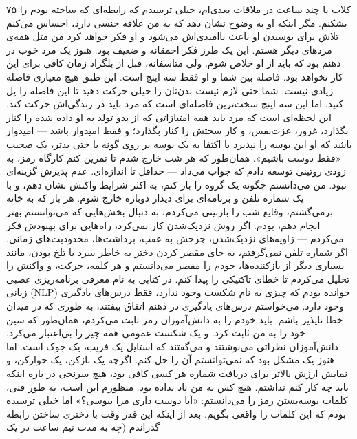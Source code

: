 ۷۵  
کلاب یا چند ساعت در ملاقات بعدی‌ام، خیلی ترسیدم که رابطه‌ای که ساخته بودم را بشکنم.  
مگر اینکه او به وضوح نشان دهد که به من علاقه جنسی دارد، احساس می‌کنم تلاش برای بوسیدن او باعث ناامیدی‌اش می‌شود  
و او فکر خواهد کرد من مثل همه‌ی مردهای دیگر هستم.  
این یک طرز فکر احمقانه و ضعیف بود. هنوز یک مرد خوب در ذهنم بود که باید از او خلاص شوم.  
ولی متاسفانه، قبل از بلگراد زمان کافی برای این کار نخواهد بود.  
فاصله بین شما و او فقط سه اینچ است. این طبق هیچ معیاری فاصله زیادی نیست.  
شما حتی لازم نیست بدن‌تان را خیلی حرکت دهید تا این فاصله را پل کنید.  
اما این سه اینچ سخت‌ترین فاصله‌ای است که مرد باید در زندگی‌اش حرکت کند.  
این لحظه‌ای است که مرد باید همه امتیازاتی که از بدو تولد به او داده شده را  
کنار بگذارد، غرور، عزت‌نفس، و کار سختش را کنار بگذارد؛  
و فقط امیدوار باشد — امیدوار باشد که او این بوسه را نپذیرد با اکتفا به یک بوسه بر روی گونه  
یا حتی بدتر، یک صحبت «فقط دوست باشیم».  
همان‌طور که هر شب خارج شدم تا تمرین کنم کارگاه رمز، به زودی  
روتینی توسعه دادم که جواب می‌داد — حداقل تا اندازه‌ای. عدم پذیرش گزینه‌ای نبود.  
من می‌دانستم چگونه یک گروه را باز کنم، به اکثر شرایط واکنش نشان دهم، و با یک شماره تلفن و برنامه‌ای برای دیدار دوباره خارج شوم.  
هر بار که به خانه برمی‌گشتم، وقایع شب را بازبینی می‌کردم،  
به دنبال بخش‌هایی که می‌توانستم بهتر انجام دهم، بودم. اگر روش نزدیک‌شدن کار نمی‌کرد،  
راه‌هایی برای بهبودش فکر می‌کردم — زاویه‌های نزدیک‌شدن، چرخش به عقب، برداشت‌ها، محدودیت‌های زمانی.  
اگر شماره تلفن نمی‌گرفتم، به جای مقصر کردن دختر به خاطر سرد یا تلخ بودن،  
مانند بسیاری دیگر از بازکننده‌ها، خودم را مقصر می‌دانستم و هر کلمه، حرکت، و واکنش را تحلیل می‌کردم تا  
خطای تاکتیکی را پیدا کنم.  
در کتابی به نام معرفی برنامه‌ریزی عصبی زبانی (NLP) خوانده بودم که چیزی  
به نام شکست وجود ندارد، فقط درس‌های یادگیری وجود دارد.  
می‌خواستم درس‌های یادگیری در ذهنم اتفاق بیفتند، به طوری که در میدان خطا ناپذیر باشم.  
باید خودم را به دانش‌آموزان رمز ثابت می‌کردم، همان‌طور که سین خود را به من ثابت کرد.  
و یک شکست عمومی همه چیز را بی‌اعتبار می‌کرد. دانش‌آموزان نظراتی می‌نوشتند  
و می‌گفتند که استایل یک فریب، یک جوک است.  
اما هنوز یک مشکل بود که نمی‌توانستم آن را حل کنم.  
اگرچه یک بازکن، یک خوارکن، و نمایش ارزش بالاتر برای دریافت شماره  
هر کسی کافی بود، هیچ سرنخی در باره اینکه باید چه کار کنم نداشتم.  
هیچ کس به من یاد نداده بود. منظورم این است، به طور فنی، کلمات  
بوسه‌بستن رمز را می‌دانستم: «آیا دوست داری مرا ببوسی؟» اما  
خیلی ترسیده بودم که این کلمات را واقعی بگویم. بعد از اینکه این قدر  
وقت با دختری ساختن رابطه گذراندم (چه به مدت نیم ساعت در یک